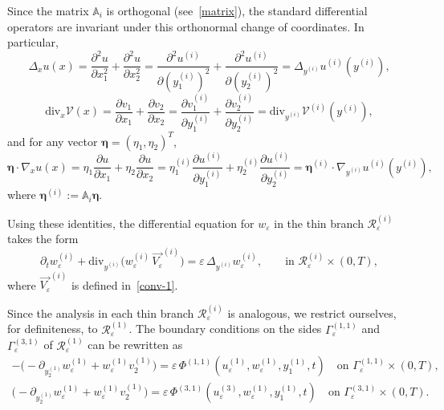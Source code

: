\documentclass[reqno]{amsart}            %
\numberwithin{equation}{section}
\begin{document}
	
	Since the matrix \(\mathbb{A}_i\) is orthogonal (see~\eqref{matrix}), the
	standard differential operators are invariant under this orthonormal change of
	coordinates. In particular,
	\begin{equation}\label{lap_1}
		\Delta_x u(x)
		=\frac{\partial^2 u}{\partial x_1^2}
		+\frac{\partial^2 u}{\partial x_2^2}
		=\frac{\partial^2 u^{(i)}}{\partial (y_1^{(i)})^2}
		+\frac{\partial^2 u^{(i)}}{\partial (y_2^{(i)})^2}
		=\Delta_{y^{(i)}}u^{(i)}(y^{(i)}),
	\end{equation}
	\begin{equation}\label{div_1}
		\mathrm{div}_x\bm{\mathcal V}(x)
		=\frac{\partial v_1}{\partial x_1}
		+\frac{\partial v_2}{\partial x_2}
		=\frac{\partial v^{(i)}_1}{\partial y_1^{(i)}}
		+\frac{\partial v^{(i)}_2}{\partial y_2^{(i)}}
		=\mathrm{div}_{y^{(i)}}\bm{\mathcal V}^{(i)}(y^{(i)}),
	\end{equation}
	and for any vector \(\boldsymbol{\eta}=(\eta_1,\eta_2)^T\),
	\begin{equation}\label{grad_1}
		\boldsymbol{\eta}\cdot\nabla_x u(x)
		=\eta_1\frac{\partial u}{\partial x_1}
		+\eta_2\frac{\partial u}{\partial x_2}
		=\eta_1^{(i)}\frac{\partial u^{(i)}}{\partial y_1^{(i)}}
		+\eta_2^{(i)}\frac{\partial u^{(i)}}{\partial y_2^{(i)}}
		=\boldsymbol{\eta}^{(i)}\cdot\nabla_{y^{(i)}}u^{(i)}(y^{(i)}),
	\end{equation}
	where \(\boldsymbol{\eta}^{(i)}:=\mathbb{A}_i\boldsymbol{\eta}\).
	
	Using these identities, the differential equation for $w_\varepsilon$ in the
	thin branch $\mathcal{R}_\varepsilon^{(i)}$ takes the form
	\begin{equation}\label{eq-thin-rect}
		\partial_t w^{(i)}_\varepsilon
		+\mathrm{div}_{y^{(i)}}\!\big(w^{(i)}_\varepsilon\,\overrightarrow{V_\varepsilon}^{(i)}\big)
		=\varepsilon\,\Delta_{y^{(i)}} w^{(i)}_\varepsilon,
		\qquad
		\text{in }\mathcal{R}_\varepsilon^{(i)}\times(0,T),
	\end{equation}
	where $\overrightarrow{V_\varepsilon}^{(i)}$ is defined in~\eqref{conv-1}.
	
	Since the analysis in each thin branch $\mathcal{R}_\varepsilon^{(i)}$ is analogous, we restrict ourselves, for definiteness, to $\mathcal{R}_\varepsilon^{(1)}$.  
	The boundary conditions on the sides $\Gamma_\varepsilon^{(1,1)}$ and $\Gamma_\varepsilon^{(3,1)}$ of $\mathcal{R}_\varepsilon^{(1)}$ can be rewritten as
	\begin{gather}\label{lbc-1}
		-\Big(-\partial_{y^{(1)}_2}w^{(1)}_\varepsilon + w^{(1)}_\varepsilon v^{(1)}_2\Big)
		= \varepsilon\,
		\Phi^{(1,1)}\!\left(u^{(1)}_\varepsilon,w^{(1)}_\varepsilon,
		y^{(1)}_1,t\right)
		\quad\text{on }\Gamma_\varepsilon^{(1,1)}\times(0,T),
		\\[4pt]\label{lbc-2}
		\Big(-\partial_{y^{(1)}_2}w^{(1)}_\varepsilon + w^{(1)}_\varepsilon v^{(1)}_2\Big)
		= \varepsilon\,
		\Phi^{(3,1)}\!\left(u^{(3)}_\varepsilon,w^{(1)}_\varepsilon,
		y^{(1)}_1,t\right)
		\quad\text{on }\Gamma_\varepsilon^{(3,1)}\times(0,T).
	\end{gather}
	
\end{document}
